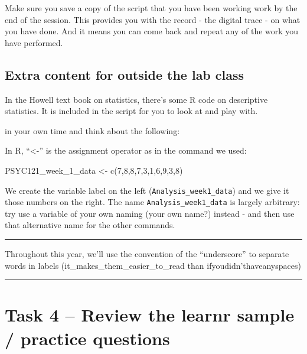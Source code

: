 \documentclass[
]{book}
\newenvironment{Shaded}{\begin{snugshade}}{\end{snugshade}}
\newcommand{\DecValTok}[1]{\textcolor[rgb]{0.00,0.00,0.81}{#1}}
\newcommand{\FunctionTok}[1]{\textcolor[rgb]{0.00,0.00,0.00}{#1}}
\newcommand{\NormalTok}[1]{#1}
\newcommand{\OtherTok}[1]{\textcolor[rgb]{0.56,0.35,0.01}{#1}}
\begin{document}
Make sure you save a copy of the script that you have been working work by the end of the session. This provides you with the record - the digital trace - on what you have done. And it means you can come back and repeat any of the work you have performed.

\hypertarget{extra-content-for-outside-the-lab-class}{%
\subsection{Extra content for outside the lab class}\label{extra-content-for-outside-the-lab-class}}

In the Howell text book on statistics, there's some R code on descriptive statistics. It is included in the script for you to look at and play with.

in your own time and think about the following:

In R, ``\textless-'' is the assignment operator as in the command we used:

\begin{Shaded}
\begin{Highlighting}[]
\NormalTok{PSYC121\_week\_1\_data }\OtherTok{\textless{}{-}} \FunctionTok{c}\NormalTok{(}\DecValTok{7}\NormalTok{,}\DecValTok{8}\NormalTok{,}\DecValTok{8}\NormalTok{,}\DecValTok{7}\NormalTok{,}\DecValTok{3}\NormalTok{,}\DecValTok{1}\NormalTok{,}\DecValTok{6}\NormalTok{,}\DecValTok{9}\NormalTok{,}\DecValTok{3}\NormalTok{,}\DecValTok{8}\NormalTok{)}
\end{Highlighting}
\end{Shaded}

We create the variable label on the left (\texttt{Analysis\_week1\_data}) and we give it those numbers on the right. The name \texttt{Analysis\_week1\_data} is largely arbitrary: try use a variable of your own naming (your own name?) instead - and then use that alternative name for the other commands.

\begin{center}\rule{0.5\linewidth}{0.5pt}\end{center}

Throughout this year, we'll use the convention of the ``underscore'' to separate words in labels (it\_makes\_them\_easier\_to\_read than ifyoudidn'thaveanyspaces)

\begin{center}\rule{0.5\linewidth}{0.5pt}\end{center}

\hypertarget{task-4-review-the-learnr-sample-practice-questions}{%
\section{Task 4 -- Review the learnr sample / practice questions}\label{task-4-review-the-learnr-sample-practice-questions}}
\end{document}
